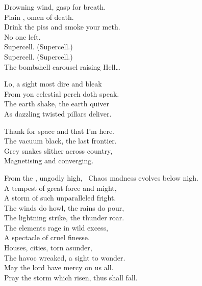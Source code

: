 Drowning wind, gasp for breath. \\
Plain , omen of death. \\
Drink the piss and smoke your meth. \\
No one left. \\

Supercell. (Supercell.) \\
Supercell. (Supercell.) \\
The bombshell carousel raising Hell… \\




Lo, a sight most dire and bleak \\
From yon celestial perch doth speak. \\
The earth shake, the earth quiver \\
As dazzling twisted pillars deliver. \\


Thank  for space and that I'm here. \\
The vacuum black, the last frontier. \\
Grey snakes slither across country, \\
Magnetising and converging. \\


From the , ungodly high, \
Chaos madness evolves below nigh. \\
A tempest of great force and might, \\
A storm of such unparalleled fright. \\
The winds do howl, the rains do pour, \\
The lightning strike, the thunder roar. \\

The elements rage in wild excess, \\
A spectacle of cruel finesse. \\
Houses, cities, torn asunder, \\
The havoc wreaked, a sight to wonder. \\
May the lord have mercy on us all. \\
Pray the storm which risen, thus shall fall. \\

